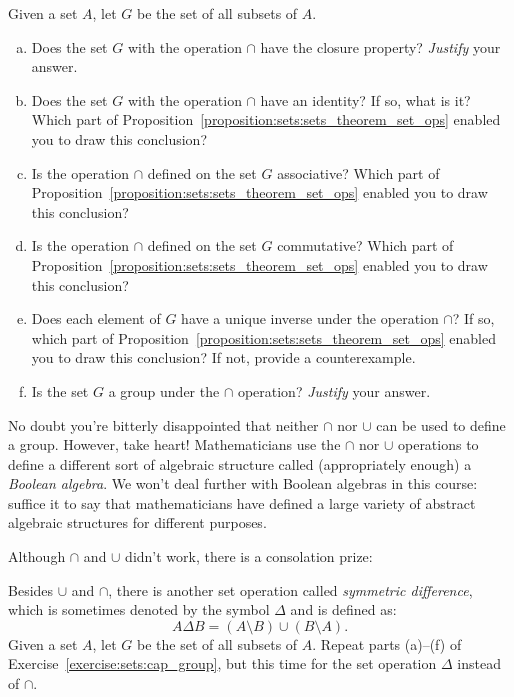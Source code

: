\begin{exercise}\label{exercise:sets:cap_group}
Given a set $A$, let $G$ be the set of all subsets of $A$. 
\begin{enumerate}[(a)]
\item
Does the set $G$  with the operation $\cap$ have the closure property? \emph{Justify} your answer.
\item
Does the set $G$  with the operation $\cap$ have an identity? If so, what is it? Which part of  Proposition~\ref{proposition:sets:sets_theorem_set_ops} enabled you to draw this conclusion?
\item
Is the operation $\cap$ defined on the set $G$ associative? Which part of  Proposition~\ref{proposition:sets:sets_theorem_set_ops} enabled you to draw this conclusion?
\item
Is the operation $\cap$ defined on the set $G$ commutative? Which part of  Proposition~\ref{proposition:sets:sets_theorem_set_ops} enabled you to draw this conclusion?
\item
Does each element of $G$ have a unique inverse under the operation $\cap$? If so, which part of  Proposition~\ref{proposition:sets:sets_theorem_set_ops} enabled you to draw this conclusion? If not, provide a counterexample.
\item
Is the set $G$ a group under the $\cap$ operation?  \emph{Justify} your answer.
\end{enumerate}
\end{exercise} 
 

No doubt you're bitterly disappointed that neither $\cap$ nor $\cup$ can be used to define a group. However, take heart! Mathematicians use the $\cap$ nor $\cup$ operations to define a different sort of algebraic structure called (appropriately enough) a \emph{Boolean algebra}. We won't deal further with Boolean algebras in this course: suffice it to say that mathematicians have defined a large variety of abstract algebraic structures for different purposes.

Although $\cap$ and $\cup$ didn't work, there is a consolation prize:
 
\begin{exercise}
 Besides $\cup$ and $\cap$, there is another set operation called \emph{symmetric difference}, which is sometimes denoted by the symbol $\Delta$ and is defined as:
\begin{equation*}
A \Delta B = (A \setminus B) \cup (B\setminus A).
\end{equation*}
Given a set $A$, let $G$ be the set of all subsets of $A$.  Repeat parts (a)--(f) of Exercise~\ref{exercise:sets:cap_group}, but this time for the set operation $\Delta$ instead of $\cap$.
\end{exercise}